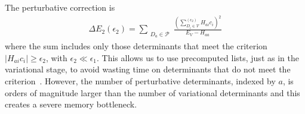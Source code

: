 \documentclass[%
reprint,
 superscriptaddress,
 amsmath,amssymb,
 aps,
]{revtex4-1}
\def\V{\mathcal{V}}
\def\P{\mathcal{P}}
\def\beq{\begin{eqnarray}}
\def\eeq{\end{eqnarray}}
\begin{document}
%


The perturbative correction is
\beq
\Delta E_{2} \left(\epsilon_2\right) = \sum_{\substack{D_a \in \P}} \frac{\left(\sum^{(\epsilon_2)}_{D_i \in \V} H_{a i} c_{i}\right) ^{2}}{E_{V} - H_{aa}}
\eeq
where the sum includes only those determinants that meet the criterion $\left|H_{ai} c_{i}\right| \ge \epsilon_{2}$, with $\epsilon_{2} \ll \epsilon_{1}$.
This allows us to use precomputed lists, just as in the variational stage, to avoid wasting time on determinants that do not meet the criterion~\cite{HolTubUmr-JCTC-16}.
However, the number of perturbative determinants, indexed by $a$, is orders of magnitude larger than the number of variational determinants and this creates
a severe memory bottleneck.
\end{document}
